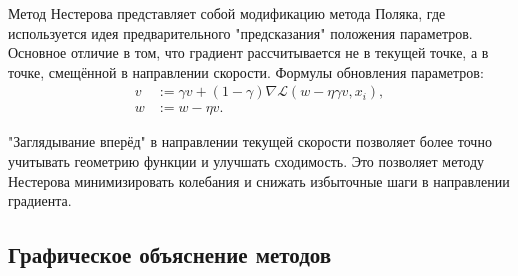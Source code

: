 Метод Нестерова представляет собой модификацию метода Поляка, где используется идея предварительного "предсказания" положения параметров. Основное отличие в том, что градиент рассчитывается не в текущей точке, а в точке, смещённой в направлении скорости. Формулы обновления параметров:
\begin{equation*}
	\begin{aligned}
		v & := \gamma v + (1 - \gamma) \nabla \mathcal{L}(w - \eta \gamma v, x_i), \\
		w & := w - \eta v.
	\end{aligned}
\end{equation*}

"Заглядывание вперёд" в направлении текущей скорости позволяет более точно учитывать геометрию функции и улучшать сходимость. Это позволяет методу Нестерова минимизировать колебания и снижать избыточные шаги в направлении градиента.

\subsection*{Графическое объяснение методов}

